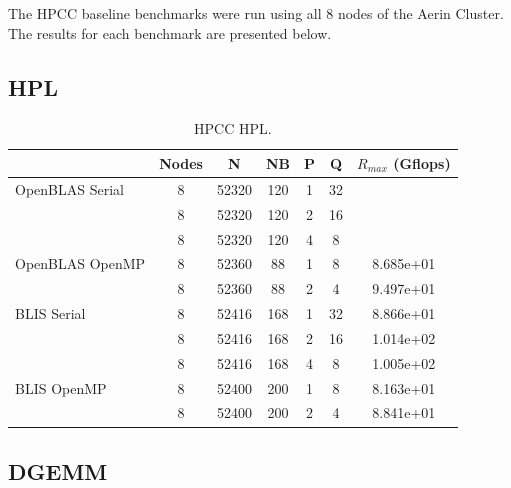 \documentclass{report}
\begin{document}
The HPCC baseline benchmarks were run using all 8 nodes of the Aerin Cluster. The results for each benchmark are presented below.


%
%
\subsection{HPL}

\begin{table}[H]
\begin{center}
\begin{tabular}{ |l|c|c|c|c|c|c| } 
\hline
                & Nodes & N & NB & P & Q & $R_{max}$ (Gflops) \\ 
\hline
OpenBLAS Serial & 8 & 52320 & 120 & 1 & 32 & \\ 
                & 8 & 52320 & 120 & 2 & 16 & \\ 
                & 8 & 52320 & 120 & 4 & 8  & \\ 
\hline
OpenBLAS OpenMP & 8 & 52360 &  88 & 1 & 8  & 8.685e+01 \\ 
                & 8 & 52360 &  88 & 2 & 4  & 9.497e+01 \\ 
\hline
BLIS Serial     & 8 & 52416 & 168 & 1 & 32 & 8.866e+01 \\ 
                & 8 & 52416 & 168 & 2 & 16 & 1.014e+02 \\ 
                & 8 & 52416 & 168 & 4 & 8  & 1.005e+02 \\ 
\hline
BLIS OpenMP     & 8 & 52400 & 200 & 1 & 8  & 8.163e+01 \\ 
                & 8 & 52400 & 200 & 2 & 4  & 8.841e+01 \\ 
\hline
\end{tabular}
\end{center}
\caption{\label{tab:table-name}HPCC HPL.}
\end{table}


%
%
\subsection{DGEMM}
\end{document}
